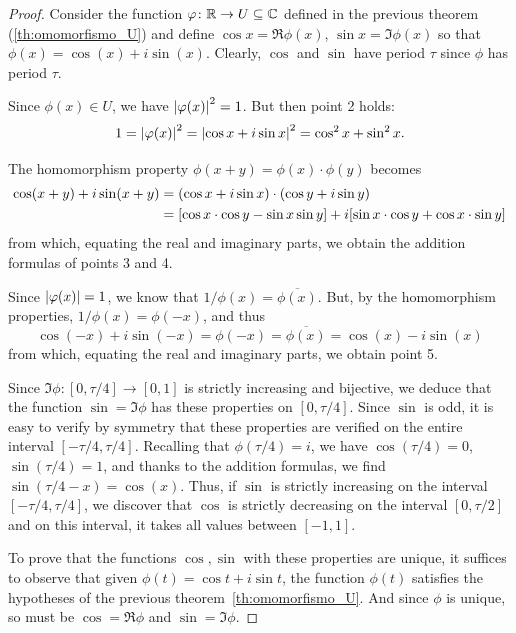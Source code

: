 \begin{proof}
Consider the function $\varphi\colon {\mathbb R} \to U\subseteq {\mathbb C}$ 
defined in the previous theorem (\ref{th:omomorfismo_U}) 
and define $\cos x = \Re \phi(x)$, $\sin x = \Im \phi(x)$
so that $\phi(x) = \cos(x) + i \sin (x)$.
Clearly, $\cos$ and $\sin$ have period $\tau$ since 
$\phi$ has period $\tau$.

Since $\phi(x)\in U$, we have ${\left|\varphi(x)\right|}^2=1$.
But then point 2 holds:
\[
 1 = {\left|\varphi(x)\right|}^2 
 = {\left|\cos x + i\sin x\right|}^2 
 = \cos^2 x + \sin^2 x.
\]

The homomorphism property 
$\phi(x+y)=\phi(x)\cdot \phi(y)$ becomes 
\begin{align*}
  \cos(x+y) + i \sin(x+y)
  &=(\cos x + i \sin x)\cdot(\cos y + i \sin y) \\
  &= 
  {\left[ \cos x\cdot \cos y - \sin x \sin y \right]}
  + i{\left[ \sin x\cdot \cos y + \cos x\cdot \sin y \right]}
\end{align*}
from which, equating the real and imaginary parts, 
we obtain the addition formulas of points 3 and 4.

Since ${\left|\varphi(x)\right|}=1$, we know that 
$1/\phi(x) = \overline{\phi(x)}$. 
But, by the homomorphism properties, $1/\phi(x)=\phi(-x)$, and thus 
\[
\cos (-x) + i \sin(-x) 
= \phi(-x) 
= \overline{\phi(x)}
= \cos(x) - i \sin(x)
\]
from which, equating the real and imaginary parts, 
we obtain point 5.

Since $\Im \phi\colon[0,\tau/4]\to[0,1]$ 
is strictly increasing and bijective,
we deduce that the function $\sin = \Im \phi$
has these properties on $[0,\tau/4]$. 
Since $\sin$ is odd, it is easy to verify
by symmetry that these properties are verified 
on the entire interval $[-\tau/4,\tau/4]$.
Recalling that $\phi(\tau/4)=i$, 
we have $\cos(\tau/4)=0$, $\sin(\tau/4)=1$, and thanks to the addition formulas,
we find $\sin(\tau/4-x)=\cos(x)$.
Thus, if $\sin$ is strictly increasing on the interval 
$[-\tau/4,\tau/4]$, we discover that $\cos$ is strictly 
decreasing on the interval $[0,\tau/2]$
and on this interval, it takes 
all values between $[-1,1]$.

To prove that the functions $\cos,\sin$ with these properties are unique,
it suffices to observe that given $\phi(t) = \cos t + i\sin t$, the function 
$\phi(t)$ satisfies the hypotheses of the previous
theorem~\ref{th:omomorfismo_U}.
And since $\phi$ is unique, so must be $\cos = \Re \phi$ and $\sin = \Im \phi$.
\end{proof}

